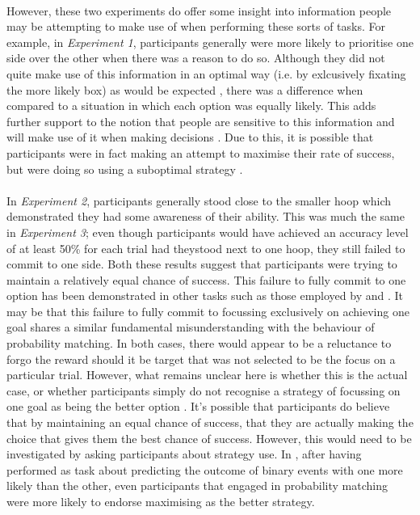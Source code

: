 \documentclass[12pt]{article}
\begin{document}
\paragraph{} However, these two experiments do offer some insight into information people may be attempting to make use of when performing these sorts of tasks. For example, in \textit{Experiment 1}, participants generally were more likely to prioritise one side over the other when there was a reason to do so. Although they did not quite make use of this information in an optimal way (i.e. by exlcusively fixating the more likely box) as would be expected \citep{koehler2014probability}, there was a difference when compared to a situation in which each option was equally likely. This adds further support to the notion that people are sensitive to this information and will make use of it when making decisions \citep{wolford2004searching,yellott1969probability}. Due to this, it is possible that participants were in fact making an attempt to maximise their rate of success, but were doing so using a suboptimal strategy \citep{Gao2015}.  

\paragraph{} In \textit{Experiment 2}, participants generally stood close to the smaller hoop which demonstrated they had some awareness of their ability. This was much the same in \textit{Experiment 3}; even though participants would have achieved an accuracy level of at least 50\% for each trial had theystood next to one hoop, they still failed to commit to one side. Both these results suggest that participants were trying to maintain a relatively equal chance of success. This failure to fully commit to one option has been demonstrated in other tasks such as those employed by \cite{CHAPMAN2010168} and \cite{Hudson2007probmove}. It may be that this failure to fully commit to focussing exclusively on achieving one goal shares a similar fundamental misunderstanding with the behaviour of probability matching. In both cases, there would appear to be a reluctance to forgo the reward should it be target that was not selected to be the focus on a particular trial. However, what remains unclear here is whether this is the actual case, or whether participants simply do not recognise a strategy of focussing on one goal as being the better option \citep{kahneman1982judgement}. It's possible that participants do believe that by maintaining an equal chance of success, that they are actually making the choice that gives them the best chance of success. However, this would need to be investigated by asking participants about strategy use. In \cite{Koehler2010}, after having performed as task about predicting the outcome of binary events with one more likely than the other, even participants that engaged in probability matching were more likely to endorse maximising as the better strategy. 
\end{document}
